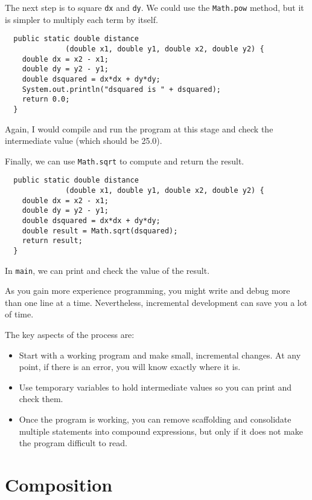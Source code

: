 \documentclass[12pt]{book}
\theoremstyle{definition}
\begin{document}
The next step is to square {\tt dx} and {\tt dy}.  We could use the
{\tt Math.pow} method, but it is simpler to multiply each term by
itself.

\begin{lstlisting}
  public static double distance
              (double x1, double y1, double x2, double y2) {
    double dx = x2 - x1;
    double dy = y2 - y1;
    double dsquared = dx*dx + dy*dy;
    System.out.println("dsquared is " + dsquared);
    return 0.0;
  }
\end{lstlisting}
%
Again, I would compile and run the program at this stage
and check the intermediate value (which should be 25.0).

Finally, we can use {\tt Math.sqrt} to compute and
return the result.

\begin{lstlisting}
  public static double distance
              (double x1, double y1, double x2, double y2) {
    double dx = x2 - x1;
    double dy = y2 - y1;
    double dsquared = dx*dx + dy*dy;
    double result = Math.sqrt(dsquared);
    return result;
  }
\end{lstlisting}
%
In {\tt main}, we can print and check the value of the result.

As you gain more experience programming, you might
write and debug more than one line at a time.  Nevertheless,
incremental development can save you a lot of
time.

The key aspects of the process are:

\begin{itemize}

\item Start with a working program and make small, incremental
changes.  At any point, if there is an error, you will know
exactly where it is.

\item Use temporary variables to hold intermediate values so
you can print and check them.

\item Once the program is working, you can remove
scaffolding and consolidate multiple statements into
compound expressions, but only if it does not make the program
difficult to read.

\end{itemize}


\section{Composition}
\end{document}
